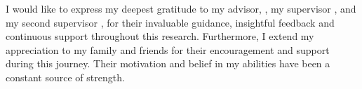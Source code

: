 \documentclass[../main.tex]{subfiles}
\begin{document}
\thispagestyle{empty}

\vspace*{2cm}

\begin{center}
 { \myAcknowTitle}
\end{center}

\vspace{1cm}
\noindent

I would like to express my deepest gratitude to my advisor, \myAdvisor, 
my supervisor \myReviewFirst, and my second supervisor \myReviewSecond, 
for their invaluable guidance, insightful feedback and continuous support 
throughout this research.
Furthermore, I extend my appreciation to my family and friends for their 
encouragement and support during this journey. Their motivation and belief in 
my abilities have been a constant source of strength.
\end{document}
